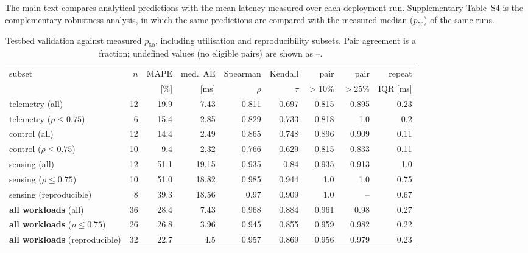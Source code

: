 \documentclass[pdflatex,sn-nature]{sn-jnl}
\theoremstyle{thmstyleone}
\theoremstyle{thmstyletwo}
\theoremstyle{thmstylethree}
\begin{document}
The main text compares analytical predictions with the mean latency measured over each
deployment run. Supplementary Table~S4 is the complementary robustness analysis, in which
the same predictions are compared with the measured median ($p_{50}$) of the same runs.

\begin{table}[!htbp]\centering
\caption{Testbed validation against measured $p_{50}$, including utilisation and
reproducibility subsets. Pair agreement is a fraction; undefined values (no eligible
pairs) are shown as --.}\label{tabS4}
{\let\scriptsize\tiny\setlength{\tabcolsep}{2pt}\scriptsize
\setlength{\tabcolsep}{3pt}
\begin{tabular}{lrrrrrrrr}
\toprule
subset & $n$ & MAPE & med.\ AE & Spearman & Kendall & pair & pair & repeat \\
 & & [\%] & [ms] & $\rho$ & $\tau$ & $>10\%$ & $>25\%$ & IQR [ms] \\
\midrule
telemetry (all) & 12 & 19.9 & 7.43 & 0.811 & 0.697 & 0.815 & 0.895 & 0.23 \\
telemetry ($\rho\le0.75$) & 6 & 15.4 & 2.85 & 0.829 & 0.733 & 0.818 & 1.0 & 0.2 \\
control (all) & 12 & 14.4 & 2.49 & 0.865 & 0.748 & 0.896 & 0.909 & 0.11 \\
control ($\rho\le0.75$) & 10 & 9.4 & 2.32 & 0.766 & 0.629 & 0.815 & 0.833 & 0.11 \\
sensing (all) & 12 & 51.1 & 19.15 & 0.935 & 0.84 & 0.935 & 0.913 & 1.0 \\
sensing ($\rho\le0.75$) & 10 & 51.0 & 18.82 & 0.985 & 0.944 & 1.0 & 1.0 & 0.75 \\
sensing (reproducible) & 8 & 39.3 & 18.56 & 0.97 & 0.909 & 1.0 & -- & 0.67 \\
\textbf{all workloads} (all) & 36 & 28.4 & 7.43 & 0.968 & 0.884 & 0.961 & 0.98 & 0.27 \\
\textbf{all workloads} ($\rho\le0.75$) & 26 & 26.8 & 3.96 & 0.945 & 0.855 & 0.959 & 0.982 & 0.22 \\
\textbf{all workloads} (reproducible) & 32 & 22.7 & 4.5 & 0.957 & 0.869 & 0.956 & 0.979 & 0.23 \\
\bottomrule
\end{tabular}}
\end{table}
\end{document}
